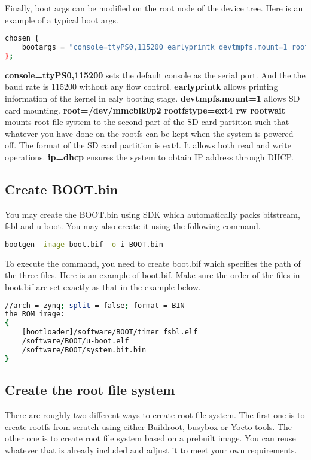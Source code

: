 \documentclass[12pt]{article} %
\begin{document}
Finally, boot args can be modified on the root node of the device tree.
Here is an example of a typical boot args.

\begin{lstlisting}[language=bash]
chosen {
    bootargs = "console=ttyPS0,115200 earlyprintk devtmpfs.mount=1 root=/dev/mmcblk0p2 rootfstype=ext4 rw rootwait ip=dhcp";
};
\end{lstlisting}
\textbf{console=ttyPS0,115200} sets the default console as the serial port. And the the baud rate is 115200 without any flow control.
\textbf{earlyprintk} allows printing information of the kernel in ealy booting stage.
\textbf{devtmpfs.mount=1} allows SD card mounting.
\textbf{root=/dev/mmcblk0p2 rootfstype=ext4 rw rootwait} mounts root file system to the second part of the SD card partition 
such that whatever you have done on the rootfs can be kept when the system is powered off. The format of the SD 
card partition is ext4. It allows both read and write operations.
\textbf{ip=dhcp} ensures the system to obtain IP address through DHCP.

\subsection{Create BOOT.bin}
You may create the BOOT.bin using SDK which automatically packs bitstream, fsbl and u-boot.
You may also create it using the following command.
\begin{lstlisting}[language=bash]
bootgen -image boot.bif -o i BOOT.bin
\end{lstlisting}

To execute the command, you need to create boot.bif which specifies the path of the three files.
Here is an example of boot.bif. Make sure the order of the files in boot.bif are set exactly as 
that in the example below.
\begin{lstlisting}[language=bash]
//arch = zynq; split = false; format = BIN
the_ROM_image:
{
	[bootloader]/software/BOOT/timer_fsbl.elf
	/software/BOOT/u-boot.elf
	/software/BOOT/system.bit.bin
}
\end{lstlisting}

\subsection{Create the root file system}
There are roughly two different ways to create root file system. The first one is to create rootfs from 
scratch using either Buildroot, busybox or Yocto tools. The other one is to create root file system 
based on a prebuilt image. You can reuse whatever that is already included and adjust it to meet your 
own requirements. 
\end{document}
